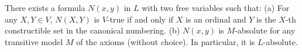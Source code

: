 There exists a formula $N(x, y)$ in $L$ with two free variables such that:
(a) For any $X, Y \in V$, $N(X, Y)$ is $V$-true if and only if $X$ is an ordinal and $Y$ is the $X$-th constructible set in the canonical numbering.
(b) $N(x, y)$ is $M$-absolute for any transitive model $M$ of the axioms (without choice). In particular, it is $L$-absolute.